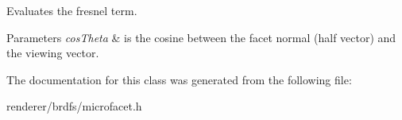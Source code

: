 Evaluates the fresnel term. 


\begin{DoxyParams}{Parameters}
{\em cosTheta} & is the cosine between the facet normal (half vector) and the viewing vector. \\
\hline
\end{DoxyParams}


The documentation for this class was generated from the following file:\begin{DoxyCompactItemize}
\item 
renderer/brdfs/microfacet.h\end{DoxyCompactItemize}
